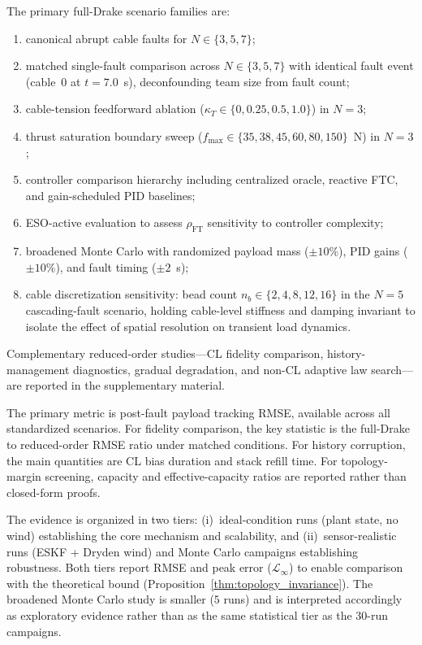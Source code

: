 The primary full-Drake scenario families are:
\begin{enumerate}[label=(\alph*),nosep]
  \item canonical abrupt cable faults for $N \in \{3, 5, 7\}$;
  \item matched single-fault comparison across $N \in \{3, 5, 7\}$ with identical fault event (cable~$0$ at $t = 7.0$~s), deconfounding team size from fault count;
  \item cable-tension feedforward ablation ($\kappa_T \in \{0, 0.25, 0.5, 1.0\}$) in $N{=}3$;
  \item thrust saturation boundary sweep ($f_{\max} \in \{35, 38, 45, 60, 80, 150\}$~N) in $N{=}3$;
  \item controller comparison hierarchy including centralized oracle, reactive FTC, and gain-scheduled PID baselines;
  \item ESO-active evaluation to assess $\rho_{\mathrm{FT}}$ sensitivity to controller complexity;
  \item broadened Monte Carlo with randomized payload mass (${\pm}10\%$), PID gains (${\pm}10\%$), and fault timing (${\pm}2$~s);
  \item cable discretization sensitivity: bead count $n_b \in \{2, 4, 8, 12, 16\}$ in the $N{=}5$ cascading-fault scenario, holding cable-level stiffness and damping invariant to isolate the effect of spatial resolution on transient load dynamics.
\end{enumerate}
Complementary reduced-order studies---CL fidelity comparison, history-management diagnostics, gradual degradation, and non-CL adaptive law search---are reported in the supplementary material.

The primary metric is post-fault payload tracking RMSE, available across all standardized scenarios. For fidelity comparison, the key statistic is the full-Drake to reduced-order RMSE ratio under matched conditions. For history corruption, the main quantities are CL bias duration and stack refill time. For topology-margin screening, capacity and effective-capacity ratios are reported rather than closed-form proofs.

The evidence is organized in two tiers: (i)~ideal-condition runs (plant state, no wind) establishing the core mechanism and scalability, and (ii)~sensor-realistic runs (ESKF + Dryden wind) and Monte Carlo campaigns establishing robustness. Both tiers report RMSE and peak error ($\mathcal{L}_\infty$) to enable comparison with the theoretical bound (Proposition~\ref{thm:topology_invariance}). The broadened Monte Carlo study is smaller ($5$ runs) and is interpreted accordingly as exploratory evidence rather than as the same statistical tier as the $30$-run campaigns.
